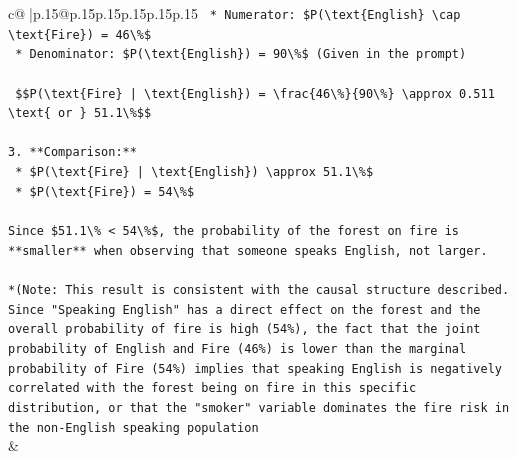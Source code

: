 \documentclass{article}
\begin{document}
{\begin{supertabular}{c@{$\;$}|p{.15\linewidth}@{}p{.15\linewidth}p{.15\linewidth}p{.15\linewidth}p{.15\linewidth}p{.15\linewidth}}
{{{\texttt{    *   Numerator: \$P(\textbackslash{}text\{English\} \textbackslash{}cap \textbackslash{}text\{Fire\}) = 46\textbackslash{}\%\$} \\
\texttt{    *   Denominator: \$P(\textbackslash{}text\{English\}) = 90\textbackslash{}\%\$ (Given in the prompt)} \\
\\ 
\texttt{    \$\$P(\textbackslash{}text\{Fire\} | \textbackslash{}text\{English\}) = \textbackslash{}frac\{46\textbackslash{}\%\}\{90\textbackslash{}\%\} \textbackslash{}approx 0.511 \textbackslash{}text\{ or \} 51.1\textbackslash{}\%\$\$} \\
\\ 
\texttt{3.  **Comparison:**} \\
\texttt{    *   \$P(\textbackslash{}text\{Fire\} | \textbackslash{}text\{English\}) \textbackslash{}approx 51.1\textbackslash{}\%\$} \\
\texttt{    *   \$P(\textbackslash{}text\{Fire\}) = 54\textbackslash{}\%\$} \\
\\ 
\texttt{Since \$51.1\textbackslash{}\% < 54\textbackslash{}\%\$, the probability of the forest on fire is **smaller** when observing that someone speaks English, not larger.} \\
\\ 
\texttt{*(Note: This result is consistent with the causal structure described. Since "Speaking English" has a direct effect on the forest and the overall probability of fire is high (54\%), the fact that the joint probability of English and Fire (46\%) is lower than the marginal probability of Fire (54\%) implies that speaking English is negatively correlated with the forest being on fire in this specific distribution, or that the "smoker" variable dominates the fire risk in the non{-}English speaking population} \\
            }
        }
    }
    & \\ \\


\end{supertabular}}
\end{document}

